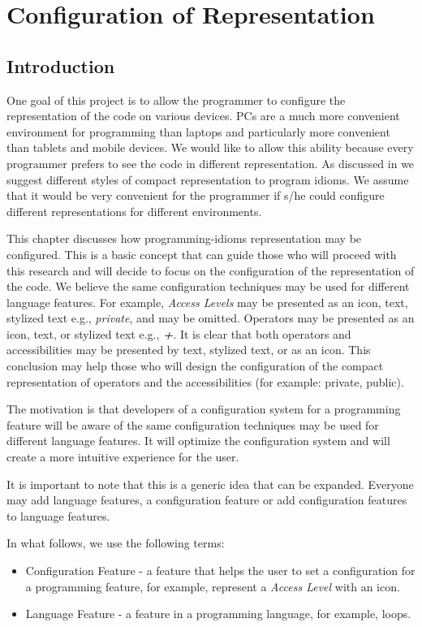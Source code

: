 \chapter{Configuration of Representation} \label{chapter:Configuration of Representation}
\section{Introduction}
One goal of this project is to allow the programmer to configure the representation of the code on various devices. PCs are a much more convenient environment for programming than laptops and particularly more convenient than tablets and mobile devices. We would like to allow this ability because every programmer prefers to see the code in different representation. As discussed in  we suggest different styles of compact representation to program idioms. We assume that it would be very convenient for the programmer if s/he could configure different representations for different environments.

This chapter discusses how programming-idioms representation may be configured. This is a basic concept that can guide those who will proceed with this research and will decide to focus on the configuration of the representation of the code. We believe the same configuration techniques may be used for different language features. For example, \textit{Access Levels} may be presented as an icon, text, stylized text e.g., \textit{private}, and may be omitted. Operators may be presented as an icon, text, or stylized text e.g., \textbf{\textit{+}}. It is clear that both operators and accessibilities may be presented by text, stylized text, or as an icon. This conclusion may help those who will design the configuration of the compact representation of operators and the accessibilities (for example: private, public).

The motivation is that developers of a configuration system for a programming feature will be aware of the same configuration techniques may be used for different language features. It will optimize the configuration system and will create a more intuitive experience for the user.

It is important to note that this is a generic idea that can be expanded. Everyone may add language features, a configuration feature or add configuration features to language features.

In what follows, we use the following terms:
\begin{itemize}
	\item Configuration Feature - a feature that helps the user to set a configuration for a programming feature, for example, represent a \textit{Access Level} with an icon.
	\item Language Feature - a feature in a programming language, for example, loops.
\end{itemize}

